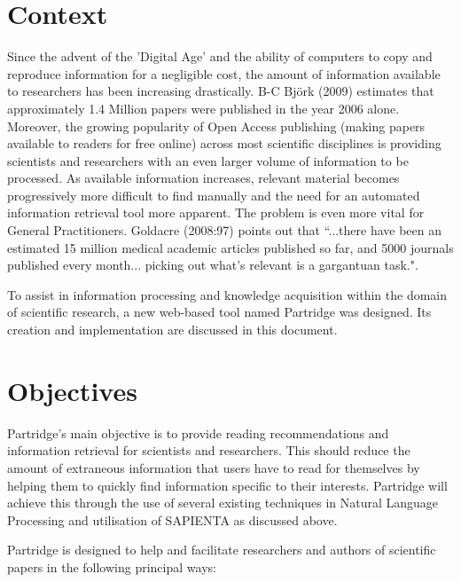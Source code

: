 %
%
\section{Context}

Since the advent of the 'Digital Age' and the ability of computers to copy and
reproduce information for a negligible cost, the amount of information
available to researchers has been increasing drastically.  B-C Bj\"{o}rk (2009)
estimates that approximately 1.4 Million papers were published in the year 2006
alone\cite{bjork2009}. Moreover, the growing popularity of Open Access
publishing (making papers available to readers for free online\cite{Suber2012})
across most scientific disciplines\cite{bjork2009}\cite{harnad2004comparing} is
providing scientists and researchers with an even larger volume of information
to be processed. As available information increases, relevant material becomes
progressively more difficult to find manually and the need for an automated
information retrieval tool more apparent. The problem is even more vital for
General Practitioners. Goldacre (2008:97) points out that ``...there have been an
estimated 15 million medical academic articles published so far, and 5000
journals published every month... picking out what's relevant is a gargantuan
task."\cite{goldacre2008bad}.

To assist in information processing and knowledge acquisition within the domain
of scientific research, a new web-based tool named Partridge was designed. Its
creation and implementation are discussed in this document.

\section{Objectives}
\label{sec:objectives}
Partridge's main objective is to provide reading recommendations and
information retrieval for scientists and researchers. This should reduce the
amount of extraneous information that users have to read for themselves by
helping them to quickly find information specific to their interests.
Partridge will achieve this through the use of several existing techniques in
Natural Language Processing and utilisation of SAPIENTA as discussed above.

Partridge is designed to help and facilitate researchers and authors of
scientific papers in the following principal ways:

